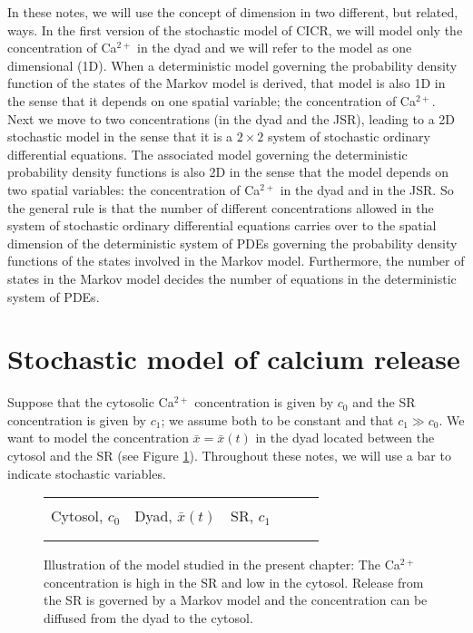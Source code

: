 In these notes, we will use the concept of dimension in two different, but related,  ways. In the first version of the stochastic model of CICR, we will model only the concentration of Ca$^{2+}$ in the dyad and we will refer to the model as one dimensional (1D). When a deterministic model governing the probability density function of the states of the Markov model is derived, that model is also 1D in the sense that it depends on one spatial variable; the concentration of Ca$^{2+}$. Next we move to two concentrations (in the dyad and the JSR), leading to a 2D stochastic model in the sense that it is a $2\times 2$ system of stochastic ordinary differential equations. The associated model governing the deterministic probability density functions is also 2D in the sense that the model depends on two spatial variables: the concentration of Ca$^{2+}$ in the dyad and in the JSR. So the general rule is that the number of different concentrations allowed in the system of stochastic ordinary differential equations carries over to the spatial dimension of the deterministic system of PDEs governing the probability density functions of the states involved in the Markov model. Furthermore, the number of states in the Markov model decides the number of equations in the deterministic system of PDEs. 


\section{Stochastic model of calcium release}
\label{stoch}

Suppose that the cytosolic Ca$^{2+}$  concentration is given by $c_{0}$ and the SR
concentration is given by $c_{1}$; we assume both to be constant and that
$c_{1}\gg c_{0}$. We want to model the concentration $\bar{x}=\bar{x}(t)$ in the dyad located
between the cytosol and the SR (see Figure \ref{geom1D}). Throughout these notes, we will use a bar to indicate stochastic variables.

\begin{figure}
[ptb]
\begin{center}
\begin{tabular}{c!{\vrule width 1pt}c!{\vrule width 1pt}c} 
&& \\
Cytosol, $c_0$ & Dyad, $\bar{x}(t)$ & SR, $c_1$ \ \ \ \ \  \\
&& \\ 
\end{tabular}
\caption{Illustration of the model studied in the present chapter: The Ca$^{2+}$ concentration is high in the SR and low in the cytosol. Release from the SR is governed by a Markov model and the
concentration can be diffused from the dyad to the cytosol.}
\label{geom1D}
\end{center}
\end{figure}

